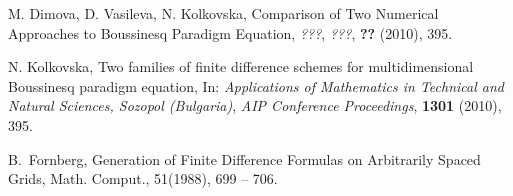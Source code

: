 \documentclass[%
 aip,
cp,  %
 amsmath,amssymb,%
 reprint,%
]{revtex4-2}
\begin{document}
\begin{thebibliography}{99}
 M. Dimova, D. Vasileva, N. Kolkovska, Comparison of Two Numerical Approaches to Boussinesq Paradigm Equation,
{\it ???},
\emph{???}, \textbf{??} (2010), 395.

 N. Kolkovska, Two families of finite difference schemes for multidimensional Boussinesq paradigm equation, In:
{\it Applications of Mathematics in Technical and Natural Sciences,  Sozopol (Bulgaria)},
\emph{AIP Conference Proceedings}, \textbf{1301} (2010), 395.

B.~Fornberg, Generation of Finite Difference Formulas on Arbitrarily Spaced Grids, 
Math. Comput., 51(1988),  699 -- 706.

%
\end{thebibliography}
\end{document}

